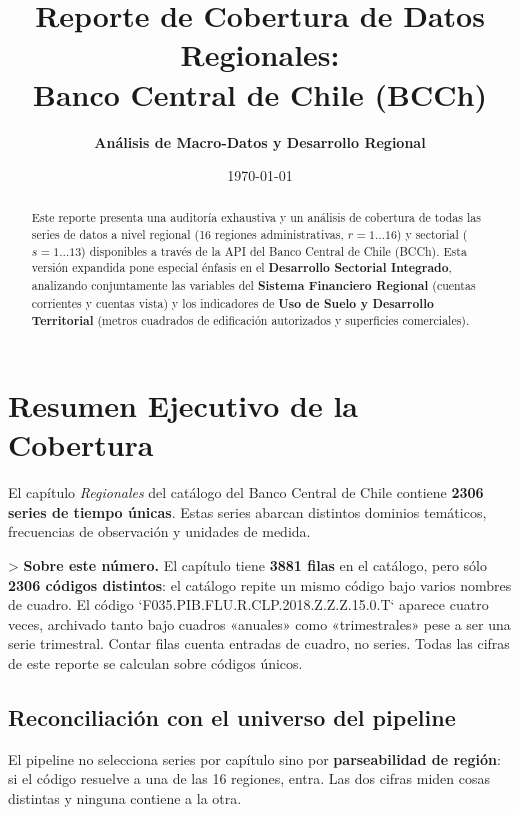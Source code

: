 \documentclass[11pt,a4paper]{article}
\title{\textbf{Reporte de Cobertura de Datos Regionales:\\ Banco Central de Chile (BCCh)}}
\author{\textbf{Análisis de Macro-Datos y Desarrollo Regional}}
\date{\today}
\begin{document}
\maketitle

\begin{abstract}
Este reporte presenta una auditoría exhaustiva y un análisis de cobertura de todas las series de datos a nivel regional (16 regiones administrativas, $r = 1 \dots 16$) y sectorial ($s = 1 \dots 13$) disponibles a través de la API del Banco Central de Chile (BCCh). Esta versión expandida pone especial énfasis en el \textbf{Desarrollo Sectorial Integrado}, analizando conjuntamente las variables del \textbf{Sistema Financiero Regional} (cuentas corrientes y cuentas vista) y los indicadores de \textbf{Uso de Suelo y Desarrollo Territorial} (metros cuadrados de edificación autorizados y superficies comerciales).
\end{abstract}

\strut

\section{Resumen Ejecutivo de la Cobertura}

El capítulo \textit{Regionales} del catálogo del Banco Central de Chile contiene \textbf{2306 series de tiempo únicas}. Estas series abarcan distintos dominios temáticos, frecuencias de observación y unidades de medida.

> \textbf{Sobre este número.} El capítulo tiene \textbf{3881 filas} en el catálogo, pero sólo \textbf{2306 códigos distintos}: el catálogo repite un mismo código bajo varios nombres de cuadro. El código `F035.PIB.FLU.R.CLP.2018.Z.Z.Z.15.0.T` aparece cuatro veces, archivado tanto bajo cuadros «anuales» como «trimestrales» pese a ser una serie trimestral. Contar filas cuenta entradas de cuadro, no series. Todas las cifras de este reporte se calculan sobre códigos únicos.


\subsection{Reconciliación con el universo del pipeline}

El pipeline no selecciona series por capítulo sino por \textbf{parseabilidad de región}: si el código resuelve a una de las 16 regiones, entra. Las dos cifras miden cosas distintas y ninguna contiene a la otra.
\end{document}
